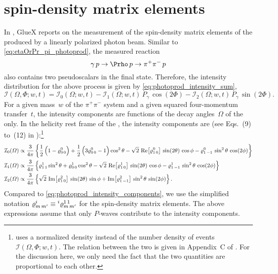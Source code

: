 \section{\Prho spin-density matrix elements}%
\label{sec:rho_sdme}

In , GlueX reports on the measurement of the
spin-density matrix elements of the \Prho produced by a linearly
polarized photon beam.  Similar to \cref{eq:etaOrPr_pi_photoprod}, the
measured reaction
\begin{equation}
  \label{eq:rho_photoprod}
  \gamma\, p \to \Prho\, p \to \pi^+ \pi^-\, p
\end{equation}
also contains two pseudoscalars in the final state.  Therefore, the
intensity distribution for the above process is given by
\cref{eq:photoprod_intensity_sum}, \ie
\begin{equation}
  \label{eq:photoprod_intensity_sum2}
  \mathcal{I}(\Omega, \Phi; w, t)
  = \mathcal{I}_0(\Omega; w, t)
  - \mathcal{I}_1(\Omega; w, t)\, P_\gamma\, \cos(2 \Phi)
  - \mathcal{I}_2(\Omega; w, t)\, P_\gamma\, \sin(2 \Phi).
\end{equation}
For a given mass~$w$ of the $\pi^+ \pi^-$ system and a given squared
four-momentum transfer~$t$, the intensity components are functions of
the decay angles~$\Omega$ of the \Prho only.  In the helicity rest
frame of the \Prho, the intensity components are (see Eqs.~(9) to~(12)
in ):\footnote{ uses a
normalized density instead of the number density of events
$\mathcal{I}(\Omega, \Phi; w, t)$.  The relation between the two is
given in Appendix~C of .  For the discussion
here, we only need the fact that the two quantities are proportional
to each other.}
\begin{align}
  \label{eq:intensity_0_rho_photoprod}
  \mathcal{I}_0(\Omega)
  \propto{}& \frac{3}{4 \pi} \cBrk{\frac{1}{2} \rBrk{1 - \varrho^0_{0\, 0}} + \frac{1}{2} \rBrk{3 \varrho^0_{0\, 0} - 1} \cos^2 \theta
  - \sqrt{2}\, \Re[1]{\varrho^0_{1\, 0}}\, \sin(2 \theta)\, \cos \phi - \varrho^0_{1\, {-1}}\, \sin^2 \theta\, \cos(2 \phi)} \\
  \label{eq:intensity_1_rho_photoprod}
  \mathcal{I}_1(\Omega)
  \propto{}& \frac{3}{4 \pi} \cBrk{\varrho^1_{1\, 1} \sin^2 \theta + \varrho^1_{0\, 0} \cos^2 \theta
  - \sqrt{2}\, \Re[1]{\varrho^1_{1\, 0}}\, \sin(2 \theta)\, \cos \phi - \varrho^1_{1\, {-1}}\, \sin^2 \theta\, \cos(2 \phi)} \\
  \label{eq:intensity_2_rho_photoprod}
  \mathcal{I}_2(\Omega)
  \propto{}& \frac{3}{4 \pi} \cBrk{\sqrt{2}\, \Im[1]{\varrho^2_{1\, 0}}\, \sin(2 \theta)\, \sin \phi
  + \Im[1]{\varrho^2_{1\, {-1}}}\, \sin^2 \theta\, \sin(2 \phi)}.
\end{align}
Compared to \cref{eq:photoprod_intensity_components}, we use the
simplified notation $\varrho^i_{m\, m'} \equiv
\prescript{i}{}{\varrho}^{1\, 1}_{m\, m'}$ for the spin-density matrix
elements.  The above expressions assume that only $P$-waves contribute
to the intensity components.

